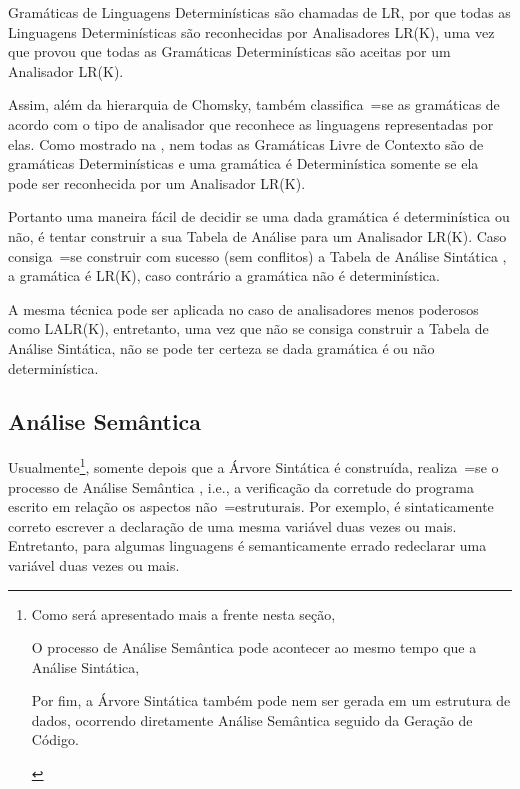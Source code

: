 Gramáticas de Linguagens Determinísticas são chamadas de LR,
por que todas as Linguagens Determinísticas são reconhecidas por Analisadores LR(K),
uma vez que  provou que todas as Gramáticas Determinísticas são aceitas por um Analisador LR(K).

Assim,
além da hierarquia de Chomsky,
também classifica~=se as gramáticas de acordo com o tipo de analisador que reconhece as linguagens representadas por elas.
Como mostrado na ,
nem todas as Gramáticas Livre de Contexto são de gramáticas Determinísticas e
uma gramática é Determinística somente se ela pode ser reconhecida por um Analisador LR(K).

Portanto uma maneira fácil de decidir se uma dada gramática é determinística ou
não,
é tentar construir a sua Tabela de Análise para um Analisador LR(K).
Caso consiga~=se construir com sucesso (sem conflitos) a Tabela de Análise Sintática \cite{ahoCompilerDragonBook},
a gramática é LR(K),
caso contrário a gramática não é determinística.

A mesma técnica pode ser aplicada no caso de analisadores menos poderosos como LALR(K),
entretanto,
uma vez que não se consiga construir a Tabela de Análise Sintática,
não se pode ter certeza se dada gramática é ou não determinística.


\subsection{Análise Semântica}
\label{analiseSemantica}

Usualmente\footnote{
Como será apresentado mais a frente nesta seção,
\begin{inparaenum}[1)]
\item O processo de Análise Semântica pode acontecer ao mesmo tempo que a Análise Sintática,
\item Por fim,
a Árvore Sintática também pode nem ser gerada em um estrutura de dados,
ocorrendo diretamente Análise Semântica seguido da Geração de Código.
\end{inparaenum}
},
somente depois que a Árvore Sintática é construída,
realiza~=se o processo de Análise Semântica \cite{ahoCompilerDragonBook},
i.e.,
a verificação da corretude do programa escrito em relação os aspectos não~=estruturais.
Por exemplo,
é sintaticamente correto escrever a declaração de uma mesma variável duas vezes ou
mais. Entretanto,
para algumas linguagens é semanticamente errado redeclarar uma variável duas vezes ou
mais.

